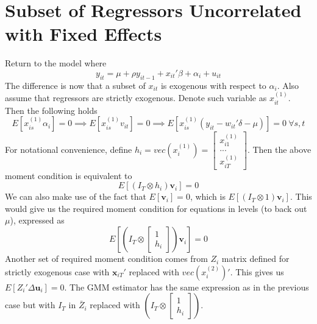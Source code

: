 \section{Subset of Regressors Uncorrelated with Fixed Effects}
Return to the model where
\[
y_{it}=\mu+\rho y_{it-1}+x_{it}'\beta+\alpha_i + u_{it}
\]
The difference is now that a subset of $x_{it}$ is exogenous with respect to  $\alpha_i$. Also assume that regressors are strictly exogenous. Denote such variable as $x_{it}^{(1)}$. Then the following holds
\[
E[x_{is}^{(1)}\alpha_i]=0\implies E[x_{is}^{(1)}v_{it}]=0\implies E[x_{is}^{(1)}(y_{it}-w_{it}'\delta-\mu)]=0 \ \forall s,t
\]
For notational convenience, define $h_i = vec(x_i^{(1)})=\begin{bmatrix} x_{i1}^{(1)} \\ ... \\ x_{iT}^{(1)}\end{bmatrix}$. Then the above moment condition is equivalent to
\[
E[(I_T\otimes h_i)\mathbf{v}_i]=0
\]
We can also make use of the fact that $E[\mathbf{v}_i]=0$, which is $E[(I_T\otimes 1)\mathbf{v}_i]$. This would give us the required moment condition for equations in levels (to back out $\mu$), expressed as
\[
E\left[\left(I_T\otimes \begin{bmatrix}1 \\h_i\end{bmatrix}\right)\mathbf{v}_i\right]=0
\]
Another set of required moment condition comes from $Z_i$ matrix defined for strictly exogenous case with $\mathbf{x}_{iT}'$ replaced with $vec(x_i^{(2)})'$. This gives us $E[Z_i'\Delta \mathbf{u}_i]=0$. The GMM estimator has the same expression as in the previous case but with $I_T$ in $\bar{Z}_i$ replaced with $\left(I_T\otimes \begin{bmatrix}1 \\h_i\end{bmatrix}\right)$.
